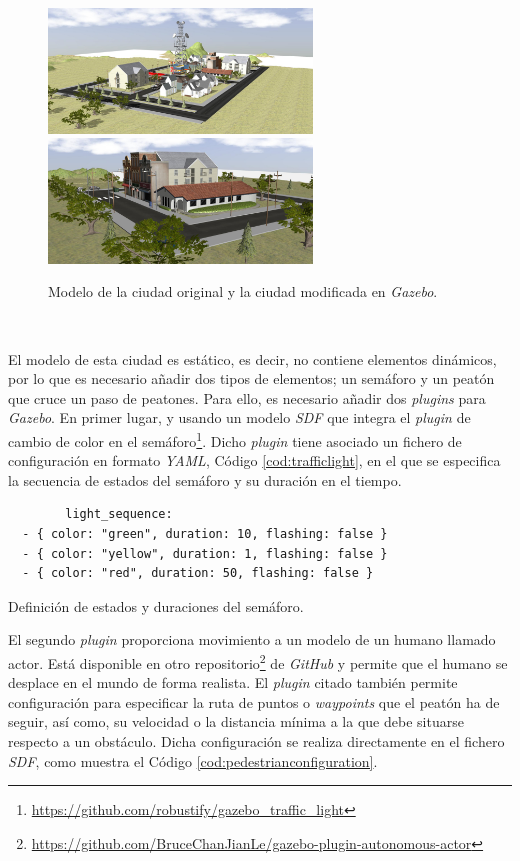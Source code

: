 \begin{figure} [h!]
	\begin{center}
		\includegraphics[width=7cm]{figs/city2}\hspace{1cm}\includegraphics[width=7cm]{figs/smallcity}
	\end{center}
	\caption{Modelo de la ciudad original y la ciudad modificada en \textit{Gazebo}.}
	\label{fig:cityversus}
\end{figure}\

El modelo de esta ciudad es estático, es decir, no contiene elementos dinámicos, por lo que es necesario añadir dos tipos de elementos; un semáforo y un peatón que cruce un paso de peatones. Para ello, es necesario añadir dos \textit{plugins} para \textit{Gazebo}. En primer lugar, y usando un modelo \textit{SDF} que integra el \textit{plugin} de cambio de color en el semáforo\footnote{\url{https://github.com/robustify/gazebo_traffic_light}}. Dicho \textit{plugin} tiene asociado un fichero de configuración en formato \textit{YAML}, Código \ref{cod:trafficlight}, en el que se especifica la secuencia de estados del semáforo y su duración en el tiempo.\\

\begin{code}[h]
	\begin{lstlisting}
		light_sequence:
  - { color: "green", duration: 10, flashing: false }
  - { color: "yellow", duration: 1, flashing: false }
  - { color: "red", duration: 50, flashing: false }
	\end{lstlisting}
	\caption[Definición de estados y duraciones del semáforo.]{Definición de estados y duraciones del semáforo.}
	\label{cod:trafficlight}
\end{code}

El segundo \textit{plugin} proporciona movimiento a un modelo de un humano llamado actor. Está disponible en otro repositorio\footnote{\url{https://github.com/BruceChanJianLe/gazebo-plugin-autonomous-actor}} de \textit{GitHub} y permite que el humano se desplace en el mundo de forma realista. El \textit{plugin} citado también permite configuración para especificar la ruta de puntos o \textit{waypoints} que el peatón ha de seguir, así como, su velocidad o la distancia mínima a la que debe situarse respecto a un obstáculo. Dicha configuración se realiza directamente en el fichero \textit{SDF}, como muestra el Código \ref{cod:pedestrianconfiguration}.\\

